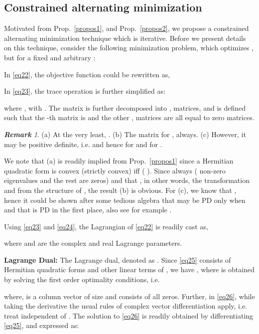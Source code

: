\documentclass[11pt,draftclsnofoot,onecolumn]{IEEEtran}
\theoremstyle{definition}
\theoremstyle{remark}
\newtheorem{remk}{\bf Remark}
\begin{document}
\subsection{Constrained alternating minimization}
Motivated from Prop.~\ref{propos1}, and Prop.~\ref{propos2}, we propose a constrained alternating minimization technique which is iterative. Before we present details on this technique, consider the following minimization problem, which optimizes , but for a fixed and arbitrary :

In \eqref{eq22}, the objective function could be rewritten as, 

In \eqref{eq23}, the trace operation  is further simplified as:

where , with . The matrix  is further decomposed into ,  matrices, and is defined such that the -th  matrix is  and the other ,  matrices are all equal to zero matrices. 

\begin{remk} \label{PSDremark}
(a) At the very least, .  (b) The matrix  for , always.  (c) However, it may be positive definite, i.e.   and hence  for  and for .
\end{remk}

We note that (a) is readily implied from Prop.~\ref{propos1} since  a Hermitian quadratic form  is convex (strictly convex) iff  ( ). Since  always ( non-zero eigenvalues and the rest are zeros) and that , in other words, the transformation  and from the structure of , the result (b) is obvious. For (c), we know that , hence it could be shown after some tedious algebra that  may be PD only when  and that  is PD in the first place, also see for example \cite[pg. 399]{horn1994}.


Using \eqref{eq23} and \eqref{eq24}, the Lagrangian of \eqref{eq22} is readily cast as,

where  and  are the complex and real Lagrange parameters.

{\bf Lagrange Dual:} The Lagrange dual, denoted as . Since \eqref{eq25} consists of Hermitian quadratic forms and other linear terms of , we have , where  is obtained by solving the first order optimality conditions, i.e.

where,  is a  column vector of size  and consists of all zeros. Further, in \eqref{eq26}, while taking the derivative the usual rules of complex vector differentiation apply, i.e. treat  independent of . The solution to \eqref{eq26} is readily obtained by differentiating \eqref{eq25}, and expressed as:
\end{document}

